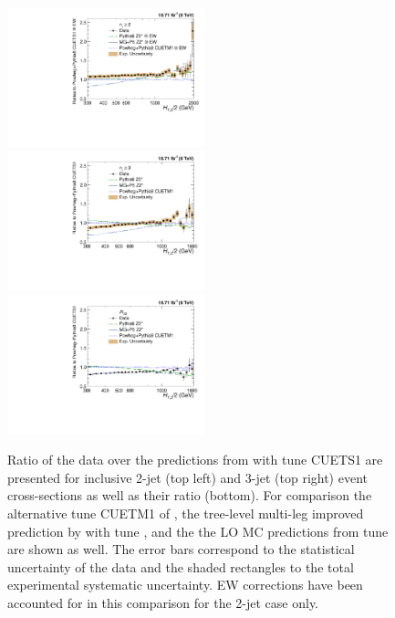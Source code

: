 \begin{figure}[!h]
 \begin{center}
 \hspace*{-5mm}\includegraphics[width=0.51\textwidth]{Plots_HT_2_150/Comparison_data_MC_samples_2_Pow_EW.pdf}%
 ~~\includegraphics[width=0.51\textwidth]{Plots_HT_2_150/Comparison_data_MC_samples_3_Pow.pdf}\\
 \includegraphics[width=0.51\textwidth]{Plots_HT_2_150/Comparison_data_MC_samples_ratio_32_Pow.pdf}\\
 \caption[Ratio of the data over the predictions from Monte Carlo simulations.]{Ratio of the data over the predictions from \POWHEGn \plusn \PYTHIAE with tune CUETS1 are presented for inclusive 2-jet (top left) and 3-jet (top right) event cross-sections as well as their ratio \ratio (bottom). For comparison the alternative tune CUETM1 of \POWHEGn \plusn \PYTHIAE, the tree-level multi-leg improved prediction by \MadGraphFn \plusn \PYTHIAS with tune \Ztwostar, and the the LO MC predictions from \PYTHIAS tune \Ztwostar are shown as well. The error bars correspond to the statistical uncertainty of the data and the shaded rectangles to the total experimental systematic uncertainty. EW corrections have been accounted for in this comparison for the 2-jet case only.}
 \label{fig:data_MC}
 \end{center}
\end{figure}

